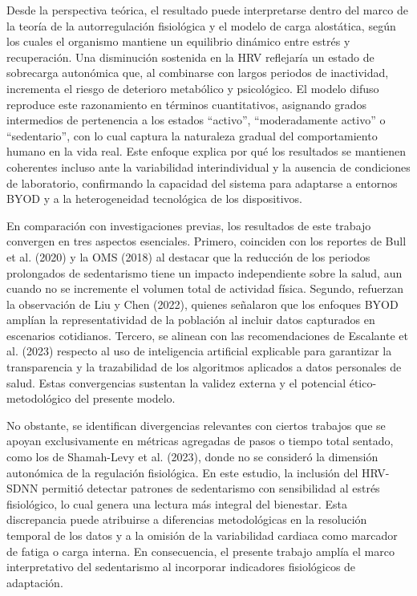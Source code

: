 Desde la perspectiva teórica, el resultado puede interpretarse dentro del marco de la teoría de la autorregulación fisiológica y el modelo de carga alostática, según los cuales el organismo mantiene un equilibrio dinámico entre estrés y recuperación. Una disminución sostenida en la HRV reflejaría un estado de sobrecarga autonómica que, al combinarse con largos periodos de inactividad, incrementa el riesgo de deterioro metabólico y psicológico. El modelo difuso reproduce este razonamiento en términos cuantitativos, asignando grados intermedios de pertenencia a los estados ``activo'', ``moderadamente activo'' o ``sedentario'', con lo cual captura la naturaleza gradual del comportamiento humano en la vida real. Este enfoque explica por qué los resultados se mantienen coherentes incluso ante la variabilidad interindividual y la ausencia de condiciones de laboratorio, confirmando la capacidad del sistema para adaptarse a entornos BYOD y a la heterogeneidad tecnológica de los dispositivos.

En comparación con investigaciones previas, los resultados de este trabajo convergen en tres aspectos esenciales. Primero, coinciden con los reportes de Bull et al. (2020) y la OMS (2018) al destacar que la reducción de los periodos prolongados de sedentarismo tiene un impacto independiente sobre la salud, aun cuando no se incremente el volumen total de actividad física. Segundo, refuerzan la observación de Liu y Chen (2022), quienes señalaron que los enfoques BYOD amplían la representatividad de la población al incluir datos capturados en escenarios cotidianos. Tercero, se alinean con las recomendaciones de Escalante et al. (2023) respecto al uso de inteligencia artificial explicable para garantizar la transparencia y la trazabilidad de los algoritmos aplicados a datos personales de salud. Estas convergencias sustentan la validez externa y el potencial ético-metodológico del presente modelo.

No obstante, se identifican divergencias relevantes con ciertos trabajos que se apoyan exclusivamente en métricas agregadas de pasos o tiempo total sentado, como los de Shamah-Levy et al. (2023), donde no se consideró la dimensión autonómica de la regulación fisiológica. En este estudio, la inclusión del HRV-SDNN permitió detectar patrones de sedentarismo con sensibilidad al estrés fisiológico, lo cual genera una lectura más integral del bienestar. Esta discrepancia puede atribuirse a diferencias metodológicas en la resolución temporal de los datos y a la omisión de la variabilidad cardiaca como marcador de fatiga o carga interna. En consecuencia, el presente trabajo amplía el marco interpretativo del sedentarismo al incorporar indicadores fisiológicos de adaptación.

